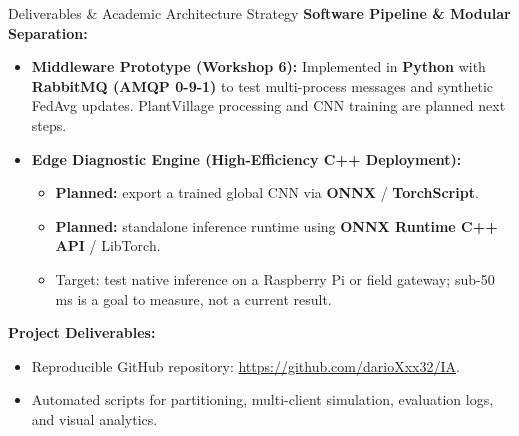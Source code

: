 \documentclass[aspectratio=169]{beamer}
\begin{document}
\begin{frame}{Deliverables \& Academic Architecture Strategy}
    \textbf{Software Pipeline \& Modular Separation:}
    \begin{itemize}
        \item \textbf{Middleware Prototype (Workshop 6):} Implemented in \textbf{Python} with \textbf{RabbitMQ (AMQP 0-9-1)} to test multi-process messages and synthetic FedAvg updates. PlantVillage processing and CNN training are planned next steps.
        \item \textbf{Edge Diagnostic Engine (High-Efficiency C++ Deployment):}
        \begin{itemize}
            \item \textbf{Planned:} export a trained global CNN via \textbf{ONNX} / \textbf{TorchScript}.
            \item \textbf{Planned:} standalone inference runtime using \textbf{ONNX Runtime C++ API} / LibTorch.
            \item Target: test native inference on a Raspberry Pi or field gateway; sub-50 ms is a goal to measure, not a current result.
        \end{itemize}
    \end{itemize}
    \vspace{0.25cm}
    \textbf{Project Deliverables:}
    \begin{itemize}
        \item Reproducible GitHub repository: \url{https://github.com/darioXxx32/IA}.
        \item Automated scripts for partitioning, multi-client simulation, evaluation logs, and visual analytics.
    \end{itemize}
\end{frame}
\end{document}
